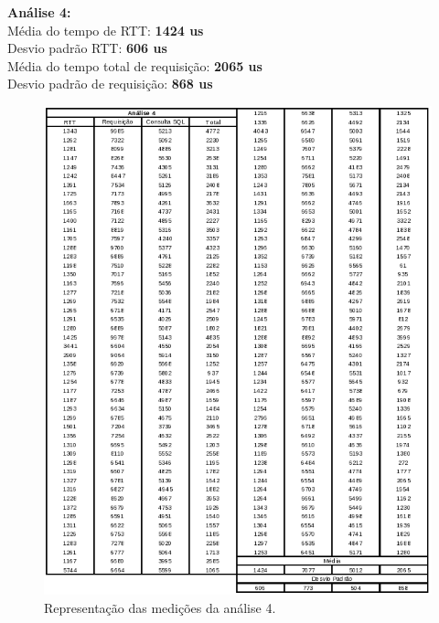 \documentclass[11pt,twoside]{article}
\begin{document}
\textbf{Análise 4: }\\
Média do tempo de RTT: \textbf{1424 us}\\
Desvio padrão RTT: \textbf{606 us}\\
Média do tempo total de requisição: \textbf{2065 us}\\
Desvio padrão de requisição: \textbf{868 us}\\
\begin{figure}[htb]
  \centering
  \includegraphics[width=15cm]{analise4.png} 
  \caption{Representação das medições da análise 4.}
  \label{fig:analise4}
\end{figure}
\end{document}
